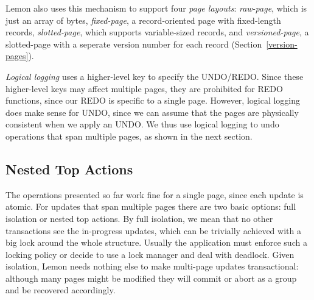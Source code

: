 \documentclass[10pt,letterpaper,twocolumn,english]{article}
\newcommand{\yad}{Lemon\xspace}
\begin{document}
\yad also uses this mechanism to support four {\em page layouts}: 
{\em raw-page}, which is just an array of
bytes, {\em fixed-page}, a record-oriented page with fixed-length records,
{\em slotted-page}, which supports variable-sized records, and 
{\em versioned-page},  a slotted-page with a seperate version number for 
each record (Section~\ref{version-pages}).  

{\em Logical logging} uses a higher-level key to specify the
UNDO/REDO.  Since these higher-level keys may affect multiple pages,
they are prohibited for REDO functions, since our REDO is specific to
a single page.  However, logical logging does make sense for UNDO,
since we can assume that the pages are physically consistent when we
apply an UNDO.  We thus use logical logging to undo operations that
span multiple pages, as shown in the next section.




\subsection{Nested Top Actions}
\label{nested-top-actions}

The operations presented so far work fine for a single page, since
each update is atomic.  For updates that span multiple pages there 
are two basic options: full isolation or nested top actions.
By full isolation, we mean that no other transactions see the
in-progress updates, which can be trivially achieved with a big lock
around the whole structure.  Usually the application must enforce 
such a locking policy or decide to use a lock manager and deal with 
deadlock.  Given isolation, \yad needs nothing else to
make multi-page updates transactional: although many pages might be
modified they will commit or abort as a group and be recovered
accordingly.
\end{document}
